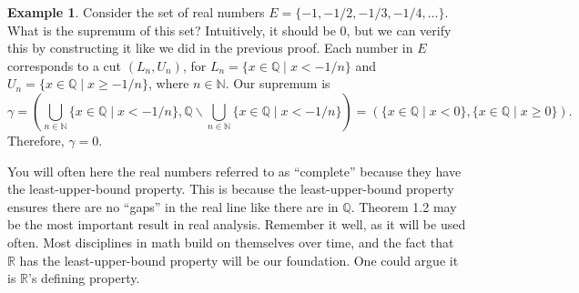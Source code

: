 \documentclass{article}
\newcommand{\N}{\mathbb{N}}
\newcommand{\R}{\mathbb{R}}
\newcommand{\Q}{\mathbb{Q}}
\theoremstyle{definition}
\newtheorem{example}{Example}[section]
\begin{document}
\begin{example}
	Consider the set of real numbers $ E=\{-1,-1/2,-1/3,-1/4,\ldots\} $. What is the supremum of this set? Intuitively, it should be $ 0 $, but we can verify this by constructing it like we did in the previous proof. Each number in $ E $ corresponds to a cut $ (L_n,U_n) $, for $ L_n=\{x\in\Q\mid x<-1/n\} $ and $ U_n=\{x\in\Q\mid x\ge -1/n\} $, where $ n\in\N $. Our supremum is $$\gamma=\left(\bigcup_{n\in \N}\{x\in\Q\mid x<-1/n\},\Q\backslash \bigcup_{n\in \N}\{x\in\Q\mid x<-1/n\}\right)=(\{x\in\Q\mid x<0\},\{x\in\Q\mid x\ge0\}). $$ Therefore, $ \gamma=0 $.  
\end{example}
You will often here the real numbers referred to as ``complete'' because they have the least-upper-bound property. This is because the least-upper-bound property ensures there are no ``gaps'' in the real line like there are in $ \Q $. Theorem 1.2 may be the most important result in real analysis. Remember it well, as it will be used often. Most disciplines in math build on themselves over time, and the fact that $ \R $ has the least-upper-bound property will be our foundation. One could argue it is $ \R $'s defining property.  
\end{document}
